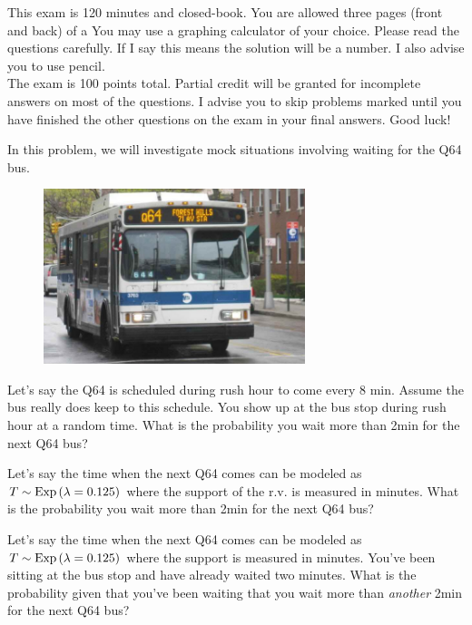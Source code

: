 \documentclass[12pt]{article}
\begin{document}
This exam is 120 minutes and closed-book. You are allowed three pages (front and back) of a  You may use a graphing calculator of your choice. Please read the questions carefully. If I say  this means the solution will be a number. I also advise you to use pencil.\\

\noindent The exam is 100 points total. Partial credit will be granted for incomplete answers on most of the questions. I advise you to skip problems marked  until you have finished the other questions on the exam  in your final answers. Good luck!

\pagebreak

\problem In this problem, we will investigate mock situations involving waiting for the Q64 bus.

\begin{figure}[h]
\begin{center}
\includegraphics[width=3in]{q64.png}
\end{center}
\end{figure}


\benum
{} Let's say the Q64 is scheduled during rush hour to come every 8 min. Assume the bus really does keep to this schedule. You show up at the bus stop during rush hour at a random time. What is the probability you wait more than 2min for the next Q64 bus? 

 Let's say the time when the next Q64 comes can be modeled as $T \sim \mathrm{Exp}\left(\lambda = 0.125\right)$ where the support of the r.v. is measured in minutes. What is the probability you wait more than 2min for the next Q64 bus? 

 Let's say the time when the next Q64 comes can be modeled as $T \sim \mathrm{Exp}\left(\lambda = 0.125\right)$ where the support is measured in minutes. You've been sitting at the bus stop and have already waited two minutes. What is the probability given that you've been waiting that you wait more than \textit{another} 2min for the next Q64 bus? 
\end{document}
